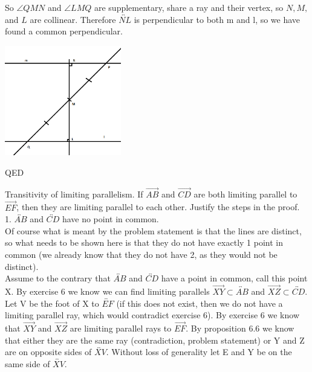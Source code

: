 \documentclass[12pt,letterpaper]{article}
\newcommand{\QED}{\begin{flushright}QED\end{flushright}}
\newcommand{\prob}[1]{\newpage\noindent {\bf #1}}
\begin{document}
So $\angle QMN$ and $\angle LMQ$ are supplementary, share a ray and their vertex, so $N,M,$ and $L$ are collinear.  Therefore $\overleftrightarrow{NL}$ is perpendicular to both m and l, so we have found a common perpendicular.  

\begin{center}
\includegraphics[width=2in]{perpendiculars.png}
\end{center}

\QED





\prob{Major Exercises 3 }

Transitivity of limiting parallelism.  If $\overrightarrow{AB}$ and $\overrightarrow{CD}$ are both limiting parallel to $\overrightarrow{EF}$, then they are limiting parallel to each other. Justify the steps in the proof.  \\

1. $\overleftrightarrow{AB}$ and $\overleftrightarrow{CD}$ have no point in common.\\

Of course what is meant by the problem statement is that the lines are distinct, so what needs to be shown here is that they do not have exactly 1 point in common (we already know that they do not have 2, as they would not be distinct).\\

Assume to the contrary that $\overleftrightarrow{AB}$ and $\overleftrightarrow{CD}$ have a point in common, call this point X.  By exercise 6 we know we can find limiting parallels $\overrightarrow{XY} \subset \overleftrightarrow{AB}$ and $\overrightarrow{XZ} \subset \overleftrightarrow{CD}$.\\

Let V be the foot of X to $\overleftrightarrow{EF}$ (if this does not exist, then we do not have a limiting parallel ray, which would contradict exercise 6).  By exercise 6 we know that $\overrightarrow{XY}$ and $\overrightarrow{XZ}$ are limiting parallel rays to $\overrightarrow{EF}$. By proposition 6.6 we know that either they are the same ray (contradiction, problem statement) or Y and Z are on opposite sides of $\overleftrightarrow{XV}$.  Without loss of generality let E and Y be on the same side of $\overleftrightarrow{XV}$.\\
\end{document}
